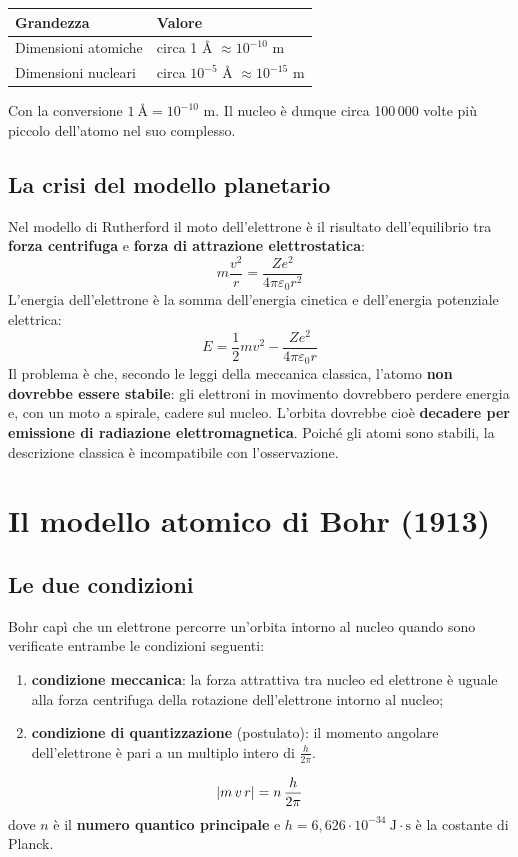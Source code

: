 \documentclass[11pt, a4paper, openright]{book}
\begin{document}
\begin{center}
\begin{tabular}{ll}
\toprule
\textbf{Grandezza} & \textbf{Valore} \\
\midrule
Dimensioni atomiche & circa 1 \AA{} $\approx 10^{-10}$ m \\
Dimensioni nucleari & circa $10^{-5}$ \AA{} $\approx 10^{-15}$ m \\
\bottomrule
\end{tabular}
\end{center}
Con la conversione $1\ \text{\AA} = 10^{-10}$ m. Il nucleo è dunque circa 100\,000 volte più piccolo dell'atomo nel suo complesso.

\subsection{La crisi del modello planetario}
Nel modello di Rutherford il moto dell'elettrone è il risultato dell'equilibrio tra \textbf{forza centrifuga} e \textbf{forza di attrazione elettrostatica}:
\[
m\frac{v^{2}}{r} = \frac{Ze^{2}}{4\pi\varepsilon_{0} r^{2}}
\tag{1}
\]
L'energia dell'elettrone è la somma dell'energia cinetica e dell'energia potenziale elettrica:
\[
E = \frac{1}{2}mv^{2} - \frac{Ze^{2}}{4\pi\varepsilon_{0} r}
\tag{2}
\]
Il problema è che, secondo le leggi della meccanica classica, l'atomo \textbf{non dovrebbe essere stabile}: gli elettroni in movimento dovrebbero perdere energia e, con un moto a spirale, cadere sul nucleo. L'orbita dovrebbe cioè \textbf{decadere per emissione di radiazione elettromagnetica}. Poiché gli atomi sono stabili, la descrizione classica è incompatibile con l'osservazione.

\newpage

\section{Il modello atomico di Bohr (1913)}
\subsection{Le due condizioni}
Bohr capì che un elettrone percorre un'orbita intorno al nucleo quando sono verificate entrambe le condizioni seguenti:
\begin{enumerate}
    \item \textbf{condizione meccanica}: la forza attrattiva tra nucleo ed elettrone è uguale alla forza centrifuga della rotazione dell'elettrone intorno al nucleo;
    \item \textbf{condizione di quantizzazione} (postulato): il momento angolare dell'elettrone è pari a un multiplo intero di $\frac{h}{2\pi}$.
\end{enumerate}
\[
\abs{m\,v\,r} = n\,\frac{h}{2\pi}
\]
dove $n$ è il \textbf{numero quantico principale} e $h = 6{,}626 \cdot 10^{-34}\ \mathrm{J\cdot s}$ è la costante di Planck.
\end{document}
